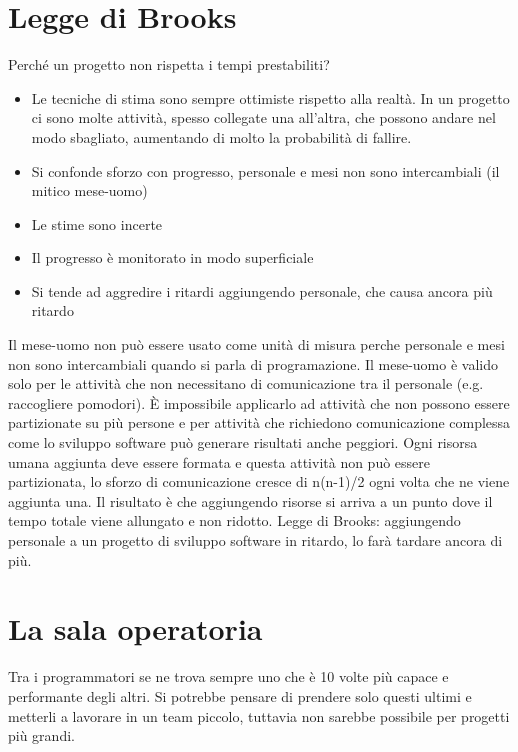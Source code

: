 \documentclass[a4paper,12pt,titlepage,oneside]{book}
\begin{document}
\section{Legge di Brooks}
Perché un progetto non rispetta i tempi prestabiliti?
\begin{itemize}
    \item Le tecniche di stima sono sempre ottimiste rispetto alla realtà.
        In un progetto ci sono molte attività, spesso collegate una all'altra, che possono andare nel modo sbagliato, aumentando di molto la probabilità di fallire.
    \item Si confonde sforzo con progresso, personale e mesi non sono intercambiali (il mitico mese-uomo)
    \item Le stime sono incerte
    \item Il progresso è monitorato in modo superficiale
    \item Si tende ad aggredire i ritardi aggiungendo personale, che causa ancora più ritardo
\end{itemize}
Il mese-uomo non può essere usato come unità di misura perche personale e mesi non sono intercambiali quando si parla di programazione. Il mese-uomo è valido solo per le attività che non necessitano di comunicazione tra il personale (e.g. raccogliere pomodori). È impossibile applicarlo ad attività che non possono essere partizionate su più persone e per attività che richiedono comunicazione complessa come lo sviluppo software può generare risultati anche peggiori.
Ogni risorsa umana aggiunta deve essere formata e questa attività non può essere partizionata, lo sforzo di comunicazione cresce di n(n-1)/2 ogni volta che ne viene aggiunta una.
Il risultato è che aggiungendo risorse si arriva a un punto dove il tempo totale viene allungato e non ridotto.
Legge di Brooks: aggiungendo personale a un progetto di sviluppo software in ritardo, lo farà tardare ancora di più.

\section{La sala operatoria}
Tra i programmatori se ne trova sempre uno che è 10 volte più capace e performante degli altri. Si potrebbe pensare di prendere solo questi ultimi e metterli a lavorare in un team piccolo, tuttavia non sarebbe possibile per progetti più grandi.
\end{document}
